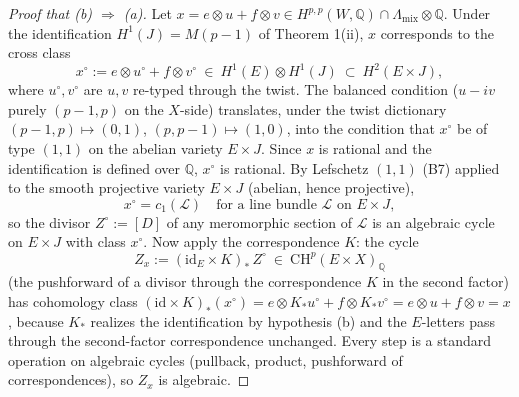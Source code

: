 \documentclass[11pt]{article}
\newcommand{\Q}{\mathbb{Q}}
\newcommand{\CH}{\mathrm{CH}}
\begin{document}
\begin{proof}[Proof that (b) $\Rightarrow$ (a)]
Let $x=e\otimes u+f\otimes v\in H^{p,p}(W,\Q)\cap\Lambda_{\mathrm{mix}}\otimes\Q$.
Under the identification $H^1(J)=M(p-1)$ of Theorem 1(ii), $x$ corresponds to
the cross class
\[
x^\circ:= e\otimes u^\circ+f\otimes v^\circ\ \in\ H^1(E)\otimes H^1(J)
\ \subset\ H^2(E\times J),
\]
where $u^\circ,v^\circ$ are $u,v$ re-typed through the twist. The balanced
condition ($u-iv$ purely $(p-1,p)$ on the $X$-side) translates, under the
twist dictionary $(p-1,p)\mapsto(0,1)$, $(p,p-1)\mapsto(1,0)$, into the
condition that $x^\circ$ be of type $(1,1)$ on the abelian variety $E\times J$.
Since $x$ is rational and the identification is defined over $\Q$, $x^\circ$ is
rational. By Lefschetz $(1,1)$ (B7) applied to the smooth projective variety
$E\times J$ (abelian, hence projective),
\[
x^\circ=c_1(\mathcal L)\quad\text{for a line bundle }\mathcal L
\text{ on }E\times J,
\]
so the divisor $Z^\circ:=[D]$ of any meromorphic section of $\mathcal L$ is an
algebraic cycle on $E\times J$ with class $x^\circ$. Now apply the
correspondence $K$: the cycle
\[
Z_x:=(\mathrm{id}_E\times K)_*\,Z^\circ\ \in\ \CH^{p}(E\times X)_\Q
\]
(the pushforward of a divisor through the correspondence $K$ in the second
factor) has cohomology class
$(\mathrm{id}\times K)_*(x^\circ)=e\otimes K_*u^\circ+f\otimes K_*v^\circ
=e\otimes u+f\otimes v=x$,
because $K_*$ realizes the identification by hypothesis (b) and the
$E$-letters pass through the second-factor correspondence unchanged. Every
step is a standard operation on algebraic cycles (pullback, product,
pushforward of correspondences), so $Z_x$ is algebraic.
\end{proof}
\end{document}
